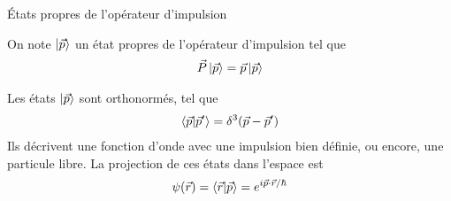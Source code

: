 \documentclass[xcolor=svgnames,t,aspectratio=169,handout]{uqtrcours}
\begin{document}
\begin{frame}{États propres de l'opérateur d'impulsion}

On note $\ket{\vec p}$ un état propres de l'opérateur d'impulsion
  tel que
\begin{align}
  \vec P \ket{\vec p} = \vec p \ket{\vec p}
\end{align}

Les états $\ket{\vec p}$ sont orthonormés, tel que
\begin{align}
  \braket{\vec p \vert \vec p'} = \delta^3(\vec p - \vec p')
\end{align}
Ils décrivent une fonction d'onde avec une impulsion bien définie,
  ou encore, une particule libre.
%
La projection de ces états dans l'espace est
%
\begin{align}
  \psi(\vec r) = \braket{\vec r \vert \vec p}
  = e^{i \vec p \cdot \vec r / \hbar}
\end{align}

\end{frame}










%
%
%
%
%
%
%
%
%  
%
\end{document}
